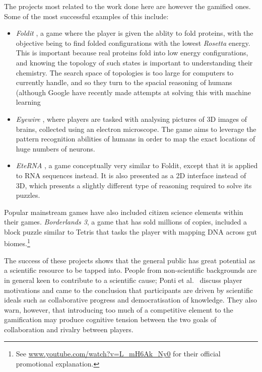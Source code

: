 The projects most related to the work done here are however the gamified ones. Some of the most successful examples of this include:
\begin{itemize}[leftmargin=*]
  \item \emph{Foldit} \cite{Cooper2010}, a game where the player is given the ablity to fold proteins, with the objective being to find folded configurations with the lowest \emph{Rosetta} energy. This is important because real proteins fold into low energy configurations, and knowing the topology of such states is important to understanding their chemistry. The search space of topologies is too large for computers to currently handle, and so they turn to the spacial reasoning of humans (although Google have recently made attempts at solving this with machine learning \cite{Senior2020}
  \item \emph{Eyewire} \cite{Bae2018}, where players are tasked with analysing pictures of 3D images of brains, collected using an electron microscope. The game aims to leverage the pattern recognition abilities of humans in order to map the exact locations of huge numbers of neurons.
  \item \emph{EteRNA} \cite{Lee2014}, a game conceptually very similar to Foldit, except that it is applied to RNA sequences instead. It is also presented as a 2D interface instead of 3D, which presents a slightly different type of reasoning required to solve its puzzles.
\end{itemize}

Popular mainstream games have also included citizen science elements within their games. \emph{Borderlands 3}, a game that has sold millions of copies, included a block puzzle similar to Tetris that tasks the player with mapping DNA across gut biomes.\footnote{See \url{www.youtube.com/watch?v=L_mH6Ak_Ny0} for their official promotional explanation.}

The success of these projects shows that the general public has great potential as a scientific resource to be tapped into.
People from non-scientific backgrounds are in general keen to contribute to a scientific cause; Ponti et al.\ \cite{Ponti2018} discuss player motivations and came to the conclusion that participants are driven by scientific ideals such as collaborative progress and democratisation of knowledge. They also warn, however, that introducing too much of a competitive element to the gamification may produce cognitive tension between the two goals of collaboration and rivalry between players.

